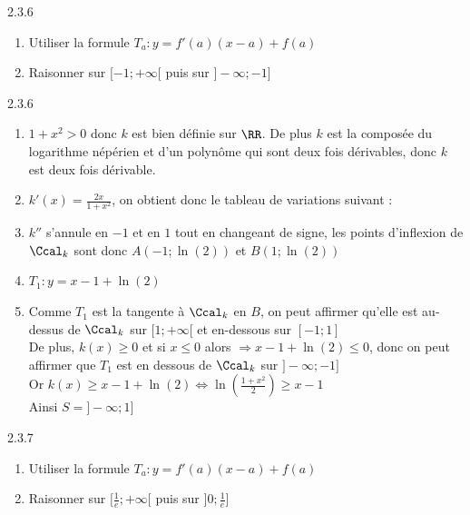\begin{Indication}{2.3.6}
	\begin{enumerate}
		\item[5.] Utiliser la formule $T_a:y=f'(a)(x-a)+f(a)$
		\item[6.] Raisonner sur $[-1;+\infty[$ puis sur $]-\infty;-1]$
	\end{enumerate}
\end{Indication}
\begin{Solution}{2.3.6}
	\begin{enumerate}
		\item $1+x^2>0$ donc $k$ est bien définie sur $\RR$. De plus $k$ est la composée du logarithme népérien et d'un polynôme qui sont deux fois dérivables, donc $k$ est deux fois dérivable.
		\item $k'(x)=\frac{2x}{1+x^2}$, on obtient donc le tableau de variations suivant :
		
		\item[4.] $k''$ s'annule en $-1$ et en $1$ tout en changeant de signe, les points d'inflexion de $\Ccal_k$ sont donc $A(-1;\ln(2))$ et $B(1;\ln(2))$
		\item[5.] $T_1:y=x-1+\ln(2)$
		\item[6.] Comme $T_1$ est la tangente à $\Ccal_k$ en $B$, on peut affirmer qu'elle est au-dessus de $\Ccal_k$ sur $[1;+\infty[$ et en-dessous sur $[-1;1]$\\
		De plus, $k(x)\geq0$ et si $x\leq0$ alors $\Rightarrow x-1+\ln(2)\leq0$, donc on peut affirmer que $T_1$ est en dessous de $\Ccal_k$ sur $]-\infty;-1]$\\
		Or $k(x)\geq x-1+\ln(2) \Leftrightarrow \ln\left(\frac{1+x^2}{2}\right)\geq x-1$\\
		Ainsi $S=]-\infty;1]$
	\end{enumerate}
\end{Solution}
\begin{Indication}{2.3.7}
	\begin{enumerate}
		\item[4.] Utiliser la formule $T_a:y=f'(a)(x-a)+f(a)$
		\item[5.] Raisonner sur $[\frac{1}{e};+\infty[$ puis sur $]0;\frac{1}{e}]$
	\end{enumerate}
\end{Indication}
